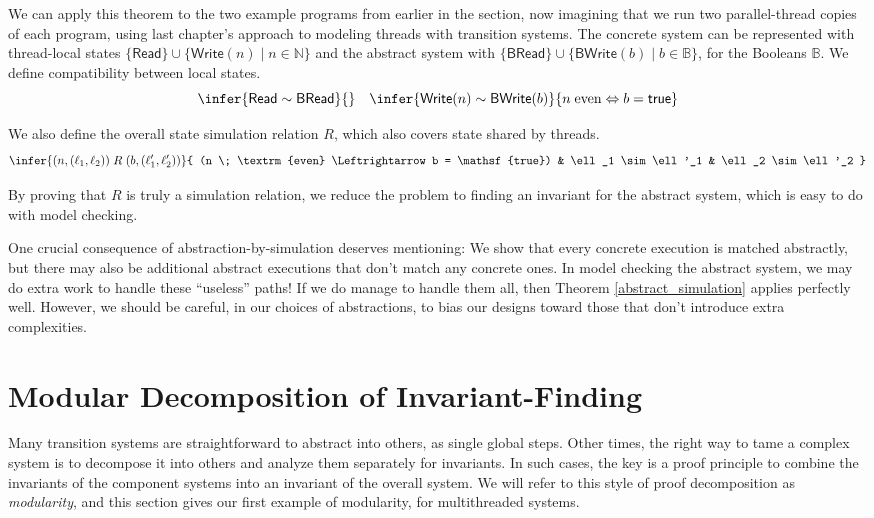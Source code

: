 \documentclass{amsbook}
\theoremstyle{definition}
\theoremstyle{remark}
\numberwithin{section}{chapter}
\numberwithin{equation}{chapter}
\begin{document}
We can apply this theorem to the two example programs from earlier in the section, now imagining that we run two parallel-thread copies of each program, using last chapter's approach to modeling threads with transition systems.
The concrete system can be represented with thread-local states $\{\mathsf{Read}\} \cup \{\mathsf{Write}(n) \mid n \in \mathbb N\}$ and the abstract system with $\{\mathsf{BRead}\} \cup \{\mathsf{BWrite}(b) \mid b \in \mathbb B\}$, for the Booleans $\mathbb B$.
We define compatibility between local states.
$$\infer{\mathsf{Read} \sim \mathsf{BRead}}{}
\quad \infer{\mathsf{Write}(n) \sim \mathsf{BWrite}(b)}{
  n \; \textrm{even} \Leftrightarrow b = \mathsf{true}
}$$

We also define the overall state simulation relation $R$, which also covers state shared by threads.
$$\infer{(n, (\ell_1, \ell_2)) \; R \; (b, (\ell'_1, \ell'_2))}{
  (n \; \textrm{even} \Leftrightarrow b = \mathsf{true})
  & \ell_1 \sim \ell'_1
  & \ell_2 \sim \ell'_2
}$$

By proving that $R$ is truly a simulation relation, we reduce the problem to finding an invariant for the abstract system, which is easy to do with model checking.

One crucial consequence of abstraction-by-simulation deserves mentioning:
We show that every concrete execution is matched abstractly, but there may also be additional abstract executions that don't match any concrete ones.
In model checking the abstract system, we may do extra work to handle these ``useless'' paths!
If we do manage to handle them all, then Theorem \ref{abstract_simulation} applies perfectly well.
However, we should be careful, in our choices of abstractions, to bias our designs toward those that don't introduce extra complexities.


\section{Modular Decomposition of Invariant-Finding}

Many transition systems are straightforward to abstract into others, as single global steps.
Other times, the right way to tame a complex system is to decompose it into others and analyze them separately for invariants.
In such cases, the key is a proof principle to combine the invariants of the component systems into an invariant of the overall system.
We will refer to this style of proof decomposition as \emph{modularity}, and this section gives our first example of modularity, for multithreaded systems.
\end{document}

